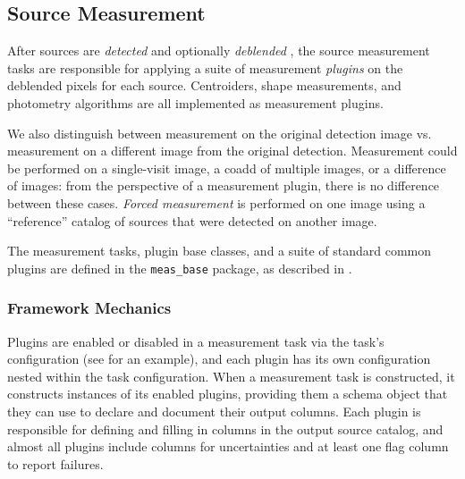 \subsection{Source Measurement}
\label{sec:measurement}

After sources are \emph{detected}  and optionally \emph{deblended} , the source measurement tasks are responsible for applying a suite of measurement \emph{plugins} on the deblended pixels for each source.
Centroiders, shape measurements, and photometry algorithms are all implemented as measurement plugins.

We also distinguish between measurement on the original detection image vs. measurement on a different image from the original detection.
Measurement could be performed on a single-visit image, a coadd of multiple images, or a difference of images: from the perspective of a measurement plugin, there is no difference between these cases.
\textit{Forced measurement} is performed on one image using a ``reference'' catalog of sources that were detected on another image.

The measurement tasks, plugin base classes, and a suite of standard common plugins are defined in the \texttt{meas\_base} package, as described in .

\subsubsection{Framework Mechanics}
\label{sec:measurement-interfaces}

Plugins are enabled or disabled in a measurement task via the task's configuration (see  for an example), and each plugin has its own configuration nested within the task configuration.
When a measurement task is constructed, it constructs instances of its enabled plugins, providing them a schema object that they can use to declare and document their output columns.
Each plugin is responsible for defining and filling in columns in the output source catalog, and almost all plugins include columns for uncertainties and at least one flag column to report failures.

